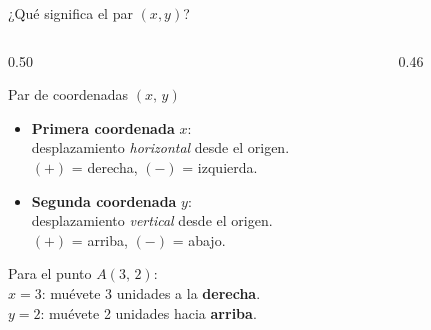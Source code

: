 \documentclass[aspectratio=169, 10pt, spanish]{beamer}
\begin{document}

\begin{frame}{¿Qué significa el par $(x, y)$?}
  \begin{columns}[c]
    \begin{column}{0.50\textwidth}
      \begin{definicionbox}{Par de coordenadas $(x,\,y)$}
        \begin{itemize}
          \item \textbf{Primera coordenada} $x$:\\
                desplazamiento \emph{horizontal}
                desde el origen.\\
                $(+)$ = derecha, $(-)$ = izquierda.
          \item \textbf{Segunda coordenada} $y$:\\
                desplazamiento \emph{vertical}
                desde el origen.\\
                $(+)$ = arriba, $(-)$ = abajo.
        \end{itemize}
      \end{definicionbox}
      \vspace{6pt}
      \begin{pasobox}[1]
        \AlmFontFootnote
        Para el punto $A(3,\,2)$:\\
        \quad$x = 3$: muévete 3 unidades a la \textbf{derecha}.\\
        \quad$y = 2$: muévete 2 unidades hacia \textbf{arriba}.
      \end{pasobox}
    \end{column}
    \begin{column}{0.46\textwidth}
      \begin{center}
\end{center}
\end{column}
\end{columns}
\end{frame}
\end{document}
